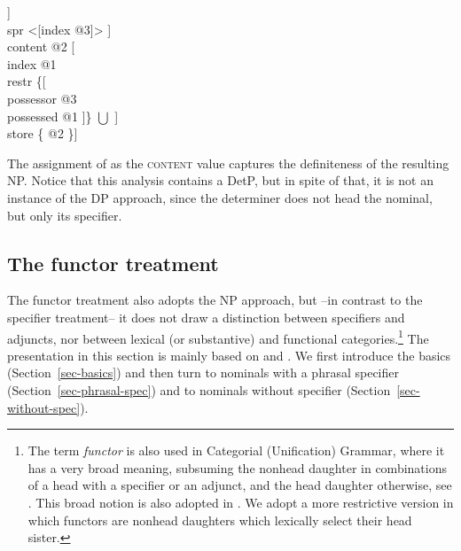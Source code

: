 \documentclass[output=paper
                ,modfonts
                ,nonflat
	        ,collection
	        ,collectionchapter
	        ,collectiontoclongg
 	        ,biblatex
                ,babelshorthands
                ,newtxmath
                ,draftmode
                ,colorlinks, citecolor=brown
]{./langsci/langscibook}
\begin{document}
\begin{exe} 
\ex\label{poss}
\begin{avm}
[cat [head [\type{det}                       \\
            spec [\type{parameter}           \\
                  index @1                  \\
                  restr \avmbox{$\Sigma$} ]] \\
      spr <[index @3]> ]                  \\
 content @2 [                \\
               index @1                     \\
               restr \{[    \\
                          possessor @3      \\
                          possessed @1 ]\} $\bigcup$ \avmbox{$\Sigma$} ] \\
 store \{ @2 \}]  
\end{avm}
\end{exe}

\noindent
The assignment of  as the \textsc{content} value captures 
the definiteness of the resulting NP. Notice that this analysis contains a DetP, 
but in spite of that, it is not an instance of the DP approach, since the 
determiner does not head the nominal, but only its specifier. 


\subsection{The functor treatment} 


The functor treatment also adopts the NP approach, but --in contrast to the 
specifier treatment-- it does not draw a distinction between specifiers and adjuncts, 
nor between lexical (or substantive) and functional categories.\footnote{The term \emph{functor} 
is also used in Categorial (Unification) Grammar, where it has 
a very broad meaning, subsuming the nonhead daughter in combinations of a 
head with a specifier or an adjunct, and the head daughter otherwise, 
see \citet{Bouma88}. This broad notion is also adopted in 
\citet{Reape94}. We adopt a more restrictive version in which functors 
are nonhead daughters which lexically select their head sister.}  
The presentation in this section is mainly based on \citet{VanEynde06} 
and \citet{Allegranza06}. We first introduce the basics (Section~\ref{sec-basics}) and then 
turn to nominals with a phrasal specifier (Section~\ref{sec-phrasal-spec}) and to nominals without specifier (Section~\ref{sec-without-spec}).    
\end{document}
